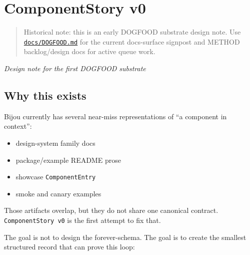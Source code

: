 \chapter{ComponentStory v0}\label{record-039}

\smallskip

\begin{quote}
Historical note: this is an early DOGFOOD substrate design note. Use \href{https://github.com/flyingrobots/bijou/blob/cbd70612140e7a450d764b3c7be1c6af878b99bc/docs/DOGFOOD.md}{\texttt{d\allowbreak{}o\allowbreak{}c\allowbreak{}s\allowbreak{}/\allowbreak{}D\allowbreak{}O\allowbreak{}G\allowbreak{}F\allowbreak{}O\allowbreak{}O\allowbreak{}D\allowbreak{}.\allowbreak{}m\allowbreak{}d}} for the current docs-surface signpost and METHOD backlog/design docs for active queue work.
\end{quote}

\emph{Design note for the first DOGFOOD substrate}

\section{Why this exists}\label{record-039-why-this-exists}

Bijou currently has several near-miss representations of ``a component in context'':

\begin{itemize}
\tightlist
\item
  design-system family docs
\item
  package/example README prose
\item
  showcase \texttt{C\allowbreak{}o\allowbreak{}m\allowbreak{}p\allowbreak{}o\allowbreak{}n\allowbreak{}e\allowbreak{}n\allowbreak{}t\allowbreak{}E\allowbreak{}n\allowbreak{}t\allowbreak{}r\allowbreak{}y}
\item
  smoke and canary examples
\end{itemize}

Those artifacts overlap, but they do not share one canonical contract. \texttt{C\allowbreak{}o\allowbreak{}m\allowbreak{}p\allowbreak{}o\allowbreak{}n\allowbreak{}e\allowbreak{}n\allowbreak{}t\allowbreak{}S\allowbreak{}t\allowbreak{}o\allowbreak{}r\allowbreak{}y\allowbreak{} \allowbreak{}v\allowbreak{}0} is the first attempt to fix that.

The goal is not to design the forever-schema. The goal is to create the smallest structured record that can prove this loop:

